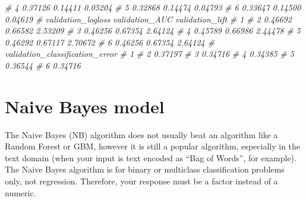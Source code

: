 \documentclass[]{book}
\newenvironment{Shaded}{\begin{snugshade}}{\end{snugshade}}
\newcommand{\CommentTok}[1]{\textcolor[rgb]{0.56,0.35,0.01}{\textit{#1}}}
\begin{document}
\begin{Shaded}
\begin{Highlighting}[]
\CommentTok{# 4                       0.37126        0.14411       0.05204}
\CommentTok{# 5                       0.32868        0.14474       0.04793}
\CommentTok{# 6                       0.33647        0.14500       0.04619}
\CommentTok{# validation_logloss validation_AUC validation_lift}
\CommentTok{# 1                                                  }
\CommentTok{# 2            0.46692        0.66582         2.53209}
\CommentTok{# 3            0.46256        0.67354         2.64124}
\CommentTok{# 4            0.45789        0.66986         2.44478}
\CommentTok{# 5            0.46292        0.67117         2.70672}
\CommentTok{# 6            0.46256        0.67354         2.64124}
\CommentTok{# validation_classification_error}
\CommentTok{# 1                                }
\CommentTok{# 2                         0.37197}
\CommentTok{# 3                         0.34716}
\CommentTok{# 4                         0.34385}
\CommentTok{# 5                         0.36544}
\CommentTok{# 6                         0.34716}
\end{Highlighting}
\end{Shaded}

\hypertarget{naive-bayes-model}{%
\section{Naive Bayes model}\label{naive-bayes-model}}

The Naive Bayes (NB) algorithm does not usually beat an algorithm like a Random Forest
or GBM, however it is still a popular algorithm, especially in the text domain (when your
input is text encoded as ``Bag of Words'', for example). The Naive Bayes algorithm is for
binary or multiclass classification problems only, not regression. Therefore, your response
must be a factor instead of a numeric.
\end{document}
